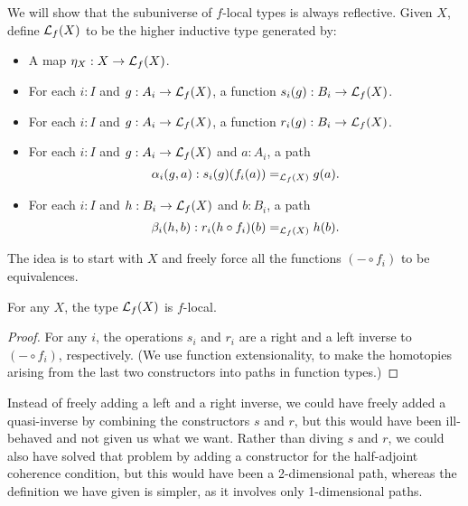 We will show that the subuniverse of $f$-local types is always reflective.
Given $X$, define $\loc f(X)$ to be the higher inductive type generated by:
\begin{itemize}
\item A map $\mreturn_X: X \to \loc f(X)$.
\item For each $i:I$ and $g:A_i\to \loc f(X)$, a function $s_{i}(g):B_i \to \loc f(X)$.
\item For each $i:I$ and $g:A_i\to \loc f(X)$, a function $r_{i}(g):B_i \to \loc f(X)$.
\item For each $i:I$ and $g:A_i\to \loc f(X)$ and $a:A_i$, a path
  \[\alpha_{i}(g,a):\id[\loc f(X)] {s_{i}(g)(f_i(a))}{g(a)}.\]
\item For each $i:I$ and $h:B_i\to \loc f(X)$ and $b:B_i$, a path
  \[\beta_i(h,b):\id[\loc f(X)]{r_{i}(h\circ f_i)(b)}{h(b)}.\]
\end{itemize}

The idea is to start with $X$ and freely force all the functions $(-\circ f_i)$ to be equivalences.

\begin{lem}\label{thm:localization-is-local}
  For any $X$, the type $\loc f(X)$ is $f$-local.
\end{lem}
\begin{proof}
  For any $i$, the operations $s_i$ and $r_i$ are a right and a left inverse to $(-\circ f_i)$, respectively.
  (We use function extensionality, to make the homotopies arising from the last two constructors into paths in function types.)
\end{proof}

Instead of freely adding a left and a right inverse, we could have freely added a quasi-inverse by combining the constructors $s$ and $r$, but this would have been ill-behaved and not given us what we want.
Rather than diving $s$ and $r$, we could also have solved that problem by adding a constructor for the half-adjoint coherence condition, but this would have been a 2-dimensional path, whereas the definition we have given is simpler, as it involves only 1-dimensional paths.

